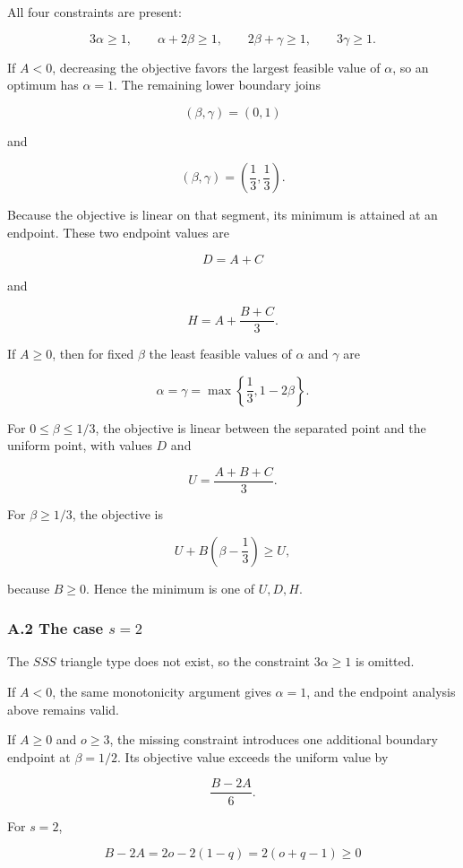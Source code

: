 \documentclass[english,11pt,a4paper]{article}
\begin{document}
All four constraints are present:

\[
3\alpha\ge1,
\qquad
\alpha+2\beta\ge1,
\qquad
2\beta+\gamma\ge1,
\qquad
3\gamma\ge1.
\]

If \(A<0\), decreasing the objective favors the largest feasible value
of \(\alpha\), so an optimum has \(\alpha=1\). The remaining lower
boundary joins

\[
(\beta,\gamma)=(0,1)
\]

and

\[
(\beta,\gamma)=\left(\frac13,\frac13\right).
\]

Because the objective is linear on that segment, its minimum is attained
at an endpoint. These two endpoint values are

\[
D=A+C
\]

and

\[
H=A+\frac{B+C}{3}.
\]

If \(A\ge0\), then for fixed \(\beta\) the least feasible values of
\(\alpha\) and \(\gamma\) are

\[
\alpha=\gamma=\max\left\{\frac13,1-2\beta\right\}.
\]

For \(0\le\beta\le1/3\), the objective is linear between the separated
point and the uniform point, with values \(D\) and

\[
U=\frac{A+B+C}{3}.
\]

For \(\beta\ge1/3\), the objective is

\[
U+B\left(\beta-\frac13\right)\ge U,
\]

because \(B\ge0\). Hence the minimum is one of \(U,D,H\).

\subsubsection{\texorpdfstring{A.2 The case
\(s=2\)}{A.2 The case s=2}}\label{a.2-the-case-s2}

The \(SSS\) triangle type does not exist, so the constraint
\(3\alpha\ge1\) is omitted.

If \(A<0\), the same monotonicity argument gives \(\alpha=1\), and the
endpoint analysis above remains valid.

If \(A\ge0\) and \(o\ge3\), the missing constraint introduces one
additional boundary endpoint at \(\beta=1/2\). Its objective value
exceeds the uniform value by

\[
\frac{B-2A}{6}.
\]

For \(s=2\),

\[
B-2A
=
2o-2(1-q)
=
2(o+q-1)\ge0
\]
\end{document}
